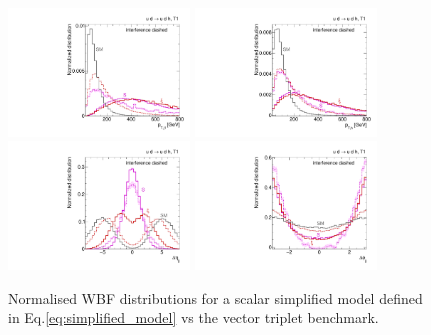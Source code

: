 \begin{figure}[t]
  \includegraphics[width=0.43\textwidth]{fig/validity/WBF_simplified_j1pt.pdf}
  \hspace*{0.05\textwidth}
  \includegraphics[width=0.43\textwidth]{fig/validity/WBF_simplified_Hpt.pdf} \\
  \includegraphics[width=0.43\textwidth]{fig/validity/WBF_simplified_deltaEtaJJ.pdf}
  \hspace*{0.05\textwidth}
  \includegraphics[width=0.43\textwidth]{fig/validity/WBF_simplified_deltaPhiJJ.pdf}
  \caption{Normalised WBF distributions for a scalar simplified model
    defined in Eq.\;\eqref{eq:simplified_model} vs the vector triplet
    benchmark.}
  \label{fig:validity_simplified}
\end{figure}

